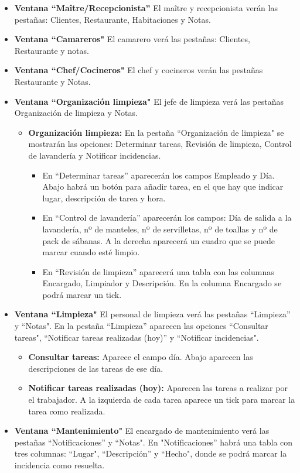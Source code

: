 \documentclass[spanish,a4paper,11pt, twoside]{report}	%
\begin{document}
\begin{itemize}
				 \item \textbf{Ventana “Maître/Recepcionista'' } El maître y recepcionista verán las pestañas: Clientes, Restaurante, Habitaciones y Notas. 
				 \item \textbf{Ventana “Camareros" } El camarero verá las pestañas: Clientes, Restaurante y notas. 	
				 \item \textbf{Ventana “Chef/Cocineros" } El chef y cocineros verán las pestañas Restaurante y Notas. 
				 \item \textbf{Ventana “Organización limpieza" } El jefe de limpieza verá las pestañas Organización de limpieza y Notas. 
					\begin{itemize}
						 \item \textbf{Organización limpieza: }En la pestaña “Organización de limpieza" se mostrarán las opciones: Determinar tareas, Revisión de limpieza, Control de lavandería y Notificar incidencias. 
						 \begin{itemize}
							\item En “Determinar tareas'' aparecerán los campos Empleado y Día. Abajo habrá un botón para añadir tarea, en el que hay que indicar lugar, descripción de tarea y hora.
							\item En “Control de lavandería'' aparecerán los campos: Día de salida a la lavandería, nº de manteles, nº de servilletas, nº de toallas y nº de pack de sábanas. A la derecha aparecerá un cuadro que se puede marcar cuando esté limpio. 
							\item En “Revisión de limpieza'' aparecerá una tabla con las columnas Encargado, Limpiador y Descripción. En la columna Encargado se podrá marcar un tick. 	
						\end{itemize}
					\end{itemize}
				 \item \textbf{Ventana “Limpieza" }El personal de limpieza verá las pestañas “Limpieza'' y “Notas". En la pestaña “Limpieza'' aparecen las opciones “Consultar tareas", “Notificar tareas realizadas (hoy)'' y “Notificar incidencias".
					\begin{itemize}
						\item \textbf{Consultar tareas:} Aparece el campo día. Abajo aparecen las descripciones de las tareas de ese día. 
						 \item \textbf{Notificar tareas realizadas (hoy): }Aparecen las tareas a realizar por el trabajador. A la izquierda de cada tarea aparece un tick para marcar la tarea como realizada. 
					\end{itemize}
				 \item \textbf{Ventana “Mantenimiento" } El encargado de mantenimiento verá las pestañas “Notificaciones'' y “Notas". En "Notificaciones'' habrá una tabla con tres columnas: “Lugar", “Descripción'' y “Hecho", donde se podrá marcar la incidencia como resuelta. 
			\end{itemize}
\end{document}
